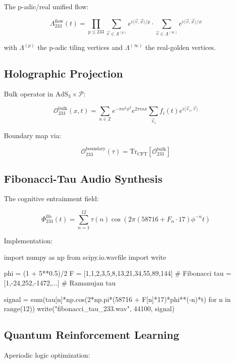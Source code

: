 \documentclass[12pt]{article}
\begin{document}
\begin{center}
The p-adic/real unified flow:

\[
\Lambda_{233}^{\text{flow}}(t) = \prod_{p\leq233} \sum_{\vec{v}\in\Lambda^{(p)}} e^{i\langle\vec{v},\vec{x}\rangle/p} \cdot \sum_{\vec{v}\in\Lambda^{(\infty)}} e^{i\langle\vec{v},\vec{x}\rangle/\phi}
\]

with $\Lambda^{(p)}$ the p-adic tiling vertices and $\Lambda^{(\infty)}$ the real-golden vertices.

\subsection{Holographic Projection}
\label{subsec:holography}

Bulk operator in $\text{AdS}_3 \times \mathcal{P}$:

\[
\mathcal{O}_{233}^{\text{bulk}}(x,t) = \sum_{n\in\mathbb{Z}} e^{-\pi n^2\phi^2} e^{2\pi i n x} \sum_{\vec{v}_i} f_i(t) e^{i\langle\vec{v}_i,\vec{r}\rangle}
\]

Boundary map via:

\[
\mathcal{O}_{233}^{\text{boundary}}(\tau) = \text{Tr}_{\text{CFT}}\left[\mathcal{O}_{233}^{\text{bulk}}\right]
\]

\subsection{Fibonacci-Tau Audio Synthesis}
\label{subsec:audio}

The cognitive entrainment field:

\[
\Phi_{233}^{\text{fib}}(t) = \sum_{n=1}^{12} \tau(n) \cos\left(2\pi (58716 + F_n \cdot 17)\phi^{-n}t\right)
\]

Implementation:
\begin{python}
import numpy as np
from scipy.io.wavfile import write

phi = (1 + 5**0.5)/2
F = [1,1,2,3,5,8,13,21,34,55,89,144] # Fibonacci
tau = [1,-24,252,-1472,...] # Ramanujan tau

signal = sum(tau[n]*np.cos(2*np.pi*(58716 + F[n]*17)*phi**(-n)*t) 
           for n in range(12))
write("fibonacci_tau_233.wav", 44100, signal)
\end{python}

\subsection{Quantum Reinforcement Learning}
\label{subsec:qrl}

Aperiodic logic optimization:


\end{center}
\end{document}
